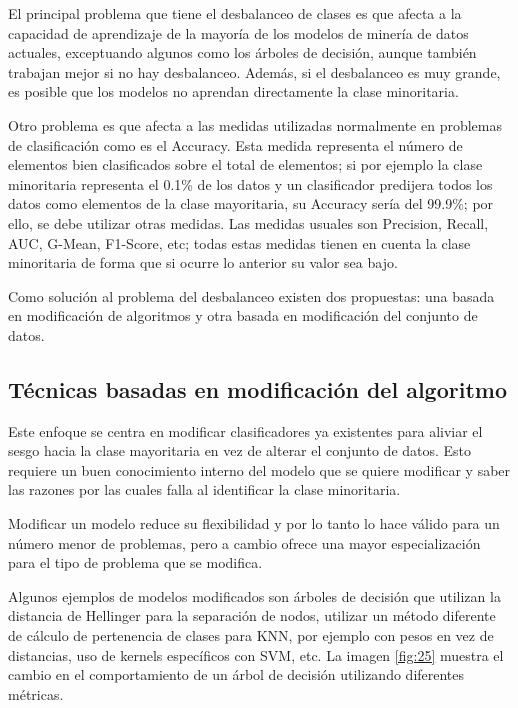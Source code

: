 El principal problema que tiene el desbalanceo de clases es que afecta a la capacidad de aprendizaje de la mayoría de los modelos de minería de datos actuales, exceptuando algunos como los árboles de decisión, aunque también trabajan mejor si no hay desbalanceo. Además, si el desbalanceo es muy grande, es posible que los modelos no aprendan directamente la clase minoritaria.\newline

Otro problema es que afecta a las medidas utilizadas normalmente en problemas de clasificación como es el Accuracy. Esta medida representa el número de elementos bien clasificados sobre el total de elementos; si por ejemplo la clase minoritaria representa el 0.1\% de los datos y un clasificador predijera todos los datos como elementos de la clase mayoritaria, su Accuracy sería del 99.9\%; por ello, se debe utilizar otras medidas. Las medidas usuales son Precision, Recall, AUC, G-Mean, F1-Score, etc; todas estas medidas tienen en cuenta la clase minoritaria de forma que si ocurre lo anterior su valor sea bajo.\newline
\newpage

Como solución al problema del desbalanceo existen dos propuestas: una basada en modificación de algoritmos y otra basada en modificación del conjunto de datos.
\subsection{Técnicas basadas en modificación del algoritmo}
Este enfoque se centra en modificar clasificadores ya existentes para aliviar el sesgo hacia la clase mayoritaria en vez de alterar el conjunto de datos. Esto requiere un buen conocimiento interno del modelo que se quiere modificar y saber las razones por las cuales falla al identificar la clase minoritaria.\newline

Modificar un modelo reduce su flexibilidad y por lo tanto lo hace válido para un número menor de problemas, pero a cambio ofrece una mayor especialización para el tipo de problema que se modifica.\newline

Algunos ejemplos de modelos modificados son árboles de decisión que utilizan la distancia de Hellinger para la separación de nodos, utilizar un método diferente de cálculo de pertenencia de clases para KNN, por ejemplo con pesos en vez de distancias, uso de kernels específicos con SVM, etc. La imagen \ref{fig:25} muestra el cambio en el comportamiento de un árbol de decisión utilizando diferentes métricas.\newline

